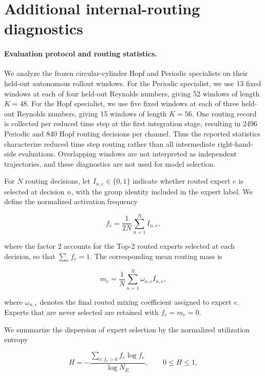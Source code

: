 \documentclass{article}
\begin{document}
\FloatBarrier
\section{Additional internal-routing diagnostics}
\label{app:internal_routing}

\paragraph{Evaluation protocol and routing statistics.}
We analyze the frozen circular-cylinder Hopf and Periodic specialists on their held-out autonomous rollout windows.
For the Periodic specialist, we use 13 fixed windows at each of four held-out Reynolds numbers, giving 52 windows of length $K=48$. For the Hopf specialist, we use five fixed windows at each of three held-out Reynolds numbers, giving 15 windows of length $K=56$. One routing record is collected per reduced time step at the first integration stage, resulting in 2496 Periodic and 840 Hopf routing decisions per channel. Thus the reported statistics characterize reduced time step routing rather than all intermediate right-hand-side evaluations. Overlapping windows are not interpreted as independent trajectories, and these diagnostics are not used for model selection.

For $N$ routing decisions, let $I_{n,e}\in\{0,1\}$ indicate whether routed expert $e$ is selected at decision $n$, with the group identity included in the expert label. We define the normalized activation frequency


\begin{equation}
  f_e
  =
  \frac{1}{2N}
  \sum_{n=1}^{N} I_{n,e},
  \label{eq:app_routing_frequency}
\end{equation}


where the factor $2$ accounts for the Top-2 routed experts selected at each decision, so that $\sum_e f_e=1$. The corresponding mean routing mass is


\begin{equation}
  m_e
  =
  \frac{1}{N}
  \sum_{n=1}^{N}
  \omega_{n,e}I_{n,e},
  \label{eq:app_routing_mass}
\end{equation}


where $\omega_{n,e}$ denotes the final routed mixing coefficient assigned to expert $e$. Experts that are never selected are retained with $f_e=m_e=0$.

We summarize the dispersion of expert selection by the normalized utilization entropy


\begin{equation}
  H
  =
  -\frac{
    \sum_{e:f_e>0} f_e\log f_e
  }{
    \log N_E
  },
  \qquad
  0\le H\le1,
  \label{eq:app_routing_entropy}
\end{equation}
\end{document}
